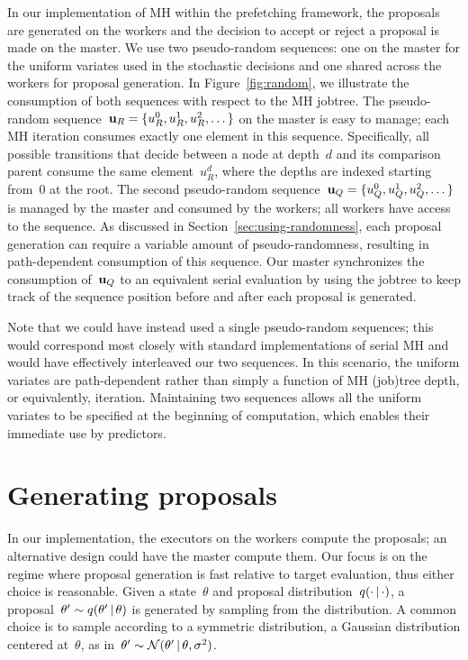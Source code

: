 \documentclass[angelino.tex]{subfiles}
\begin{document}
In our implementation of MH within the prefetching framework, the proposals are
generated on the workers and the decision to accept or reject a proposal is
made on the master.
%
We use two pseudo-random sequences:
one on the master for the uniform variates used in the stochastic decisions
and one shared across the workers for proposal generation.
%
In Figure~\ref{fig:random}, we illustrate the consumption of both sequences with
respect to the MH jobtree.
%
The pseudo-random sequence~${\mathbf{u}_R = \{u_R^0, u_R^1, u_R^2, \dots\}}$
on the master is easy to manage; each MH iteration consumes exactly one element
in this sequence.
%
Specifically, all possible transitions that decide between a node at depth~$d$
and its comparison parent consume the same element~$u_R^d$,
where the depths are indexed starting from~$0$ at the root.
%
The second pseudo-random sequence~${\mathbf{u}_Q = \{u_Q^0, u_Q^1, u_Q^2, \dots\}}$
is managed by the master and consumed by the workers; all workers have access
to the sequence.
%
As discussed in Section~\ref{sec:using-randomness}, each proposal generation can
require a variable amount of pseudo-randomness, resulting in path-dependent
consumption of this sequence.
%
Our master synchronizes the consumption of~$\mathbf{u}_Q$ to an equivalent
serial evaluation by using the jobtree to keep track of the sequence position
before and after each proposal is generated.

Note that we could have instead used a single pseudo-random sequences;
this would correspond most closely with standard implementations of serial MH
and would have effectively interleaved our two sequences.
%
In this scenario, the uniform variates are path-dependent rather than
simply a function of MH (job)tree depth, or equivalently, iteration.
%
Maintaining two sequences allows all the uniform variates to be specified at the
beginning of computation, which enables their immediate use by predictors.


\section{Generating proposals}
\label{sec:gen-proposals}

In our implementation, the executors on the workers compute the proposals;
an alternative design could have the master compute them.
%
Our focus is on the regime where proposal generation is fast relative to
target evaluation, thus either choice is reasonable.
%
Given a state~$\theta$ and proposal distribution~${q(\cdot \,|\, \cdot)}$,
a proposal~${\theta' \sim q(\theta' \,|\, \theta)}$ is generated by sampling
from the distribution.
%
A common choice is to sample according to a symmetric distribution,
\eg a Gaussian distribution centered at~$\theta$,
as in~${\theta' \sim {\mathcal N}(\theta' \,|\, \theta, \sigma^2)}$.
\end{document}
